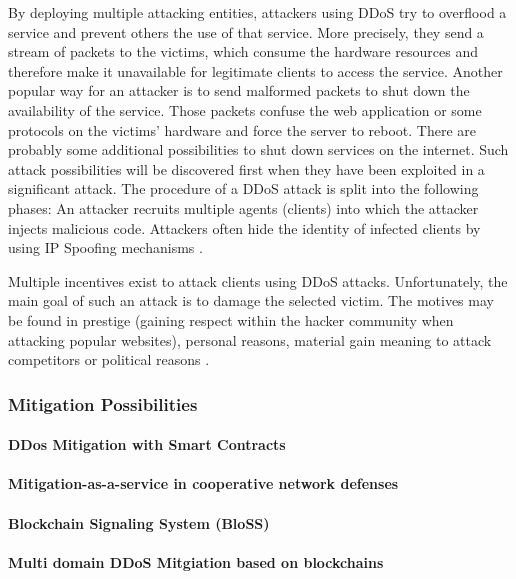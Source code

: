 By deploying multiple attacking entities, attackers using DDoS try to overflood a service and prevent others the use of that service. More precisely, they send a stream of packets to the victims, which consume the hardware resources and therefore make it unavailable for legitimate clients to access the service. Another popular way for an attacker is to send malformed packets to shut down the availability of the service. Those packets confuse the web application or some protocols on the victims' hardware and force the server to reboot. There are probably some additional possibilities to shut down services on the internet. Such attack possibilities will be discovered first when they have been exploited in a significant attack. The procedure of a DDoS attack is split into the following phases: An attacker recruits multiple agents (clients) into which the attacker injects malicious code. Attackers often hide the identity of infected clients by using IP Spoofing mechanisms \cite{Mirkovic2004}.


Multiple incentives exist to attack clients using DDoS attacks. Unfortunately, the main goal of such an attack is to damage the selected victim. The motives may be found in prestige (gaining respect within the hacker community when attacking popular websites), personal reasons, material gain meaning to attack competitors or political reasons \cite{Mirkovic2004}.


\subsubsection{Mitigation Possibilities}


\paragraph{DDos Mitigation with Smart Contracts}
\cite{Rodrigues2017}

\paragraph{Mitigation-as-a-service in cooperative network defenses}
\cite{Mannhart2018}

\paragraph{Blockchain Signaling System (BloSS)}
\cite{Rodrigues2019}

\paragraph{Multi domain DDoS Mitgiation based on blockchains}
\cite{Rodrigues2017a}
